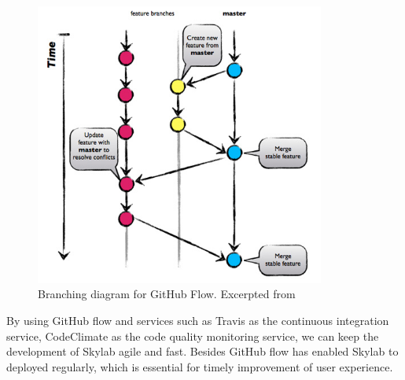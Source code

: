 \begin{figure}[h]
  \centering
  \includegraphics[width=0.85\textwidth]{Images/Github_Flow_Branching_Model.png}
  \caption{Branching diagram for GitHub Flow. Excerpted from \cite{citation8}}
  \label{fig:GithubFlow}
\end{figure}

By using GitHub flow and services such as Travis as the continuous integration service, CodeClimate as the code quality monitoring service, we can keep the development of Skylab agile and fast. Besides GitHub flow has enabled Skylab to deployed regularly, which is essential for timely improvement of user experience\cite{citation9}.
